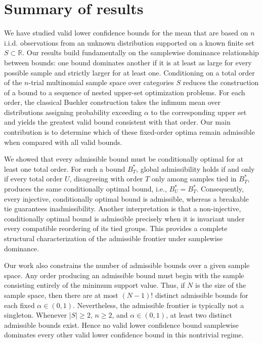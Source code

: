 \documentclass{article}
\theoremstyle{definition}
\theoremstyle{remark}
\begin{document}
\section{Summary of results}

We have studied valid lower confidence bounds for the mean that are based on $n$ i.i.d. observations from an unknown distribution  supported on a known finite set $S \subset \mathbb{R}$. Our results build fundamentally on the samplewise dominance relationship between bounds: one bound dominates another if it is at least as large for every possible sample and strictly larger for at least one. Conditioning on a total order of the $n$-trial multinomial sample space over categories $S$ reduces the construction of a bound to a sequence of nested upper-set optimization problems. For each order, the classical Buehler construction takes the infimum mean over distributions assigning probability exceeding $\alpha$ to the corresponding upper set and yields the greatest valid bound consistent with that order. Our main contribution is to determine which of these fixed-order optima remain admissible when compared with all valid bounds.

We showed that every admissible bound must be conditionally optimal for at least one total order. For such a bound $B_T^*$, global admissibility holds if and only if every total order $U$, disagreeing with order $T$ only among samples tied in $B_T^*$, produces the same conditionally optimal bound, i.e., $B_U^* = B_T^*$. Consequently, every injective, conditionally optimal bound is admissible, whereas a breakable tie guarantees inadmissibility. Another interpretation is that a non-injective, conditionally optimal bound is admissible precisely when it is invariant under every compatible reordering of its tied groups. This provides a complete structural characterization of the admissible frontier under samplewise dominance.


Our work also constrains the number of admissible bounds over a given sample space.  Any order producing an admissible bound must begin with the sample consisting entirely of the minimum support value. Thus, if $N$ is the size of the sample space, then there are at most $(N-1)!$ distinct admissible bounds for each fixed $\alpha \in (0,1)$. Nevertheless, the admissible frontier is typically not a singleton. Whenever $|S| \ge 2$, $n \ge 2$, and $\alpha \in (0,1)$, at least two distinct admissible bounds exist. Hence no valid lower confidence bound samplewise dominates every other valid lower confidence bound in this nontrivial regime. 
\end{document}
